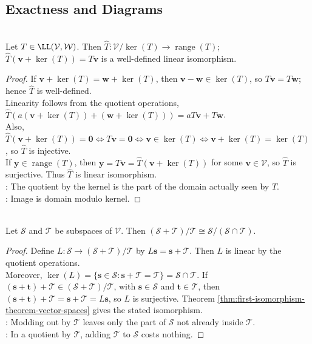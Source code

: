 \subsection{Exactness and Diagrams}

\begin{theorem} \label{thm:first-isomorphism-theorem-vector-spaces} \\
Let $T\in\LL(\mathcal{V},\mathcal{W})$. Then $\widehat{T}:\mathcal{V}/\ker(T)\to\operatorname{range}(T)$; $\widehat{T}(\mathbf{v}+\ker(T))=T\mathbf{v}$ is a well-defined linear isomorphism.
\begin{proof}
If $\mathbf{v}+\ker(T)=\mathbf{w}+\ker(T)$, then $\mathbf{v}-\mathbf{w}\in\ker(T)$, so $T\mathbf{v}=T\mathbf{w}$; hence $\widehat{T}$ is well-defined.\\
Linearity follows from the quotient operations, $\widehat{T}(a(\mathbf{v}+\ker(T))+(\mathbf{w}+\ker(T)))=aT\mathbf{v}+T\mathbf{w}$.\\
Also, $\widehat{T}(\mathbf{v}+\ker(T))=\mathbf{0} \iff T\mathbf{v}=\mathbf{0} \iff \mathbf{v}\in\ker(T) \iff \mathbf{v}+\ker(T)=\ker(T)$, so $\widehat{T}$ is injective.\\
If $\mathbf{y}\in\operatorname{range}(T)$, then $\mathbf{y}=T\mathbf{v}=\widehat{T}(\mathbf{v}+\ker(T))$ for some $\mathbf{v}\in\mathcal{V}$, so $\widehat{T}$ is surjective. Thus $\widehat{T}$ is linear isomorphism.\\
: The quotient by the kernel is the part of the domain actually seen by $T$.\\
: Image is domain modulo kernel.
\end{proof}
\end{theorem}

\begin{theorem} \label{thm:second-isomorphism-vector-spaces} \\
Let $\mathcal{S}$ and $\mathcal{T}$ be subspaces of $\mathcal{V}$. Then $(\mathcal{S}+\mathcal{T})/\mathcal{T}\cong \mathcal{S}/(\mathcal{S}\cap\mathcal{T})$.
\begin{proof}
Define $L:\mathcal{S}\to(\mathcal{S}+\mathcal{T})/\mathcal{T}$ by $L\mathbf{s}=\mathbf{s}+\mathcal{T}$. Then $L$ is linear by the quotient operations.\\
Moreover, $\ker(L)=\{\mathbf{s}\in\mathcal{S}:\mathbf{s}+\mathcal{T}=\mathcal{T}\} =\mathcal{S}\cap\mathcal{T}$.
If $(\mathbf{s}+\mathbf{t})+\mathcal{T}\in(\mathcal{S}+\mathcal{T})/\mathcal{T}$, with $\mathbf{s}\in\mathcal{S}$ and $\mathbf{t}\in\mathcal{T}$, then $(\mathbf{s}+\mathbf{t})+\mathcal{T}=\mathbf{s}+\mathcal{T}=L\mathbf{s}$, so $L$ is surjective. Theorem \ref{thm:first-isomorphism-theorem-vector-spaces} gives the stated isomorphism.\\
: Modding out by $\mathcal{T}$ leaves only the part of $\mathcal{S}$ not already inside $\mathcal{T}$.\\
: In a quotient by $\mathcal{T}$, adding $\mathcal{T}$ to $\mathcal{S}$ costs nothing.
\end{proof}
\end{theorem}

